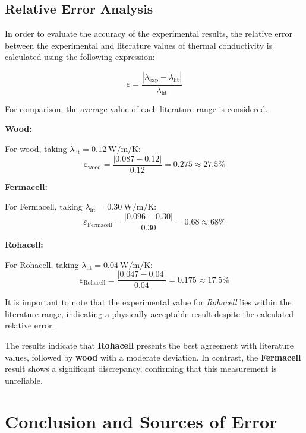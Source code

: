 \documentclass[12pt,a4paper,twoside]{article}
\begin{document}
\subsection*{Relative Error Analysis}

In order to evaluate the accuracy of the experimental results, the relative error between the experimental and literature values of thermal conductivity is calculated using the following expression:

\begin{equation}
\varepsilon = \frac{\left| \lambda_{\text{exp}} - \lambda_{\text{lit}} \right|}{\lambda_{\text{lit}}}
\end{equation}

For comparison, the average value of each literature range is considered.

\textbf{Wood:}

For wood, taking $\lambda_{\text{lit}} = 0.12\ \si{\watt\per\meter\per\kelvin}$:
\[
\varepsilon_{\text{wood}} = \frac{|0.087 - 0.12|}{0.12} = 0.275 \approx 27.5\%
\]

\textbf{Fermacell:}

For Fermacell, taking $\lambda_{\text{lit}} = 0.30\ \si{\watt\per\meter\per\kelvin}$:
\[
\varepsilon_{\text{Fermacell}} = \frac{|0.096 - 0.30|}{0.30} = 0.68 \approx 68\%
\]

\textbf{Rohacell:}

For Rohacell, taking $\lambda_{\text{lit}} = 0.04\ \si{\watt\per\meter\per\kelvin}$:
\[
\varepsilon_{\text{Rohacell}} = \frac{|0.047 - 0.04|}{0.04} = 0.175 \approx 17.5\%
\]



\begin{block}[todo]
It is important to note that the experimental value for\textit{ Rohacell} lies within the literature range, indicating a physically acceptable result despite the calculated relative error.

The results indicate that \textbf{Rohacell} presents the best agreement with literature values, followed by \textbf{wood} with a moderate deviation. In contrast, the \textbf{Fermacell} result shows a significant discrepancy, confirming that this measurement is unreliable.
\end{block}


\section{Conclusion and Sources of Error}
\end{document}
